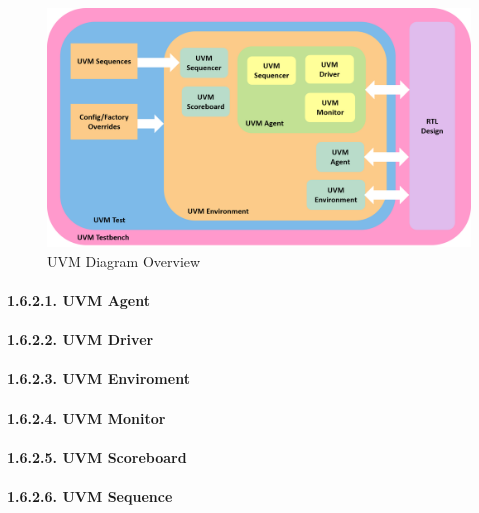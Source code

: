 \documentclass[
]{article}
\begin{document}
\begin{figure}
\centering
\includegraphics{../bench/uvm-testbench.png}
\caption{UVM Diagram Overview}
\end{figure}

\hypertarget{uvm-agent}{%
\paragraph{1.6.2.1. UVM Agent}\label{uvm-agent}}

\hypertarget{uvm-driver}{%
\paragraph{1.6.2.2. UVM Driver}\label{uvm-driver}}

\hypertarget{uvm-enviroment}{%
\paragraph{1.6.2.3. UVM Enviroment}\label{uvm-enviroment}}

\hypertarget{uvm-monitor}{%
\paragraph{1.6.2.4. UVM Monitor}\label{uvm-monitor}}

\hypertarget{uvm-scoreboard}{%
\paragraph{1.6.2.5. UVM Scoreboard}\label{uvm-scoreboard}}

\hypertarget{uvm-sequence}{%
\paragraph{1.6.2.6. UVM Sequence}\label{uvm-sequence}}
\end{document}
